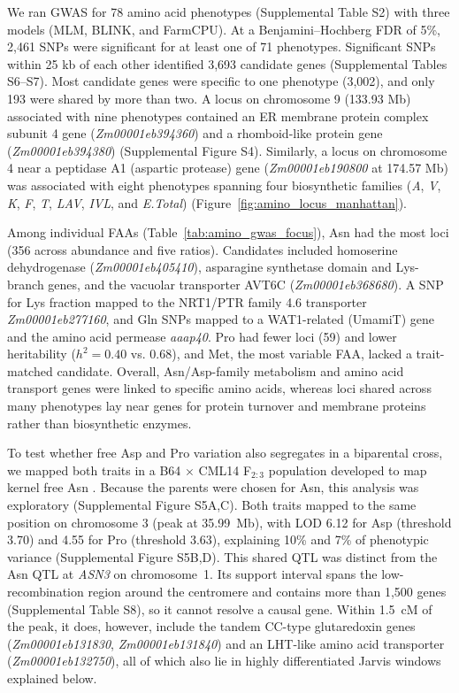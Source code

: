 \documentclass[namedate,unnumsec,webpdf,contemporary,large]{oup-authoring-template}
\begin{document}
We ran GWAS for 78 amino acid phenotypes (Supplemental Table S2) with three models (MLM, BLINK, and FarmCPU). At a Benjamini--Hochberg FDR of 5\%, 2,461 SNPs were significant for at least one of 71 phenotypes. Significant SNPs within 25 kb of each other identified 3,693 candidate genes (Supplemental Tables S6--S7). Most candidate genes were specific to one phenotype (3,002), and only 193 were shared by more than two. A locus on chromosome 9 (133.93 Mb) associated with nine phenotypes contained an ER membrane protein complex subunit 4 gene (\textit{Zm00001eb394360}) and a rhomboid-like protein gene (\textit{Zm00001eb394380}) (Supplemental Figure S4). Similarly, a locus on chromosome 4 near a peptidase A1 (aspartic protease) gene (\textit{Zm00001eb190800} at 174.57 Mb) was associated with eight phenotypes spanning four biosynthetic families (\textit{A}, \textit{V}, \textit{K}, \textit{F}, \textit{T}, \textit{LAV}, \textit{IVL}, and \textit{E.Total}) (Figure~\ref{fig:amino_locus_manhattan}).

Among individual FAAs (Table~\ref{tab:amino_gwas_focus}), Asn had the most loci (356 across abundance and five ratios). Candidates included homoserine dehydrogenase (\textit{Zm00001eb405410}), asparagine synthetase domain and Lys-branch genes, and the vacuolar transporter AVT6C (\textit{Zm00001eb368680}). A SNP for Lys fraction mapped to the NRT1/PTR family 4.6 transporter \textit{Zm00001eb277160}, and Gln SNPs mapped to a WAT1-related (UmamiT) gene and the amino acid permease \textit{aaap40}. Pro had fewer loci (59) and lower heritability ($h^2 = 0.40$ vs. 0.68), and Met, the most variable FAA, lacked a trait-matched candidate. Overall, Asn/Asp-family metabolism and amino acid transport genes were linked to specific amino acids, whereas loci shared across many phenotypes lay near genes for protein turnover and membrane proteins rather than biosynthetic enzymes.

To test whether free Asp and Pro variation also segregates in a biparental cross, we mapped both traits in a B64 $\times$ CML14 F$_{2:3}$ population developed to map kernel free Asn \citep{Fitzsimmons2026KernelKitchen}. Because the parents were chosen for Asn, this analysis was exploratory (Supplemental Figure S5A,C). Both traits mapped to the same position on chromosome 3 (peak at 35.99~Mb), with LOD 6.12 for Asp (threshold 3.70) and 4.55 for Pro (threshold 3.63), explaining 10\% and 7\% of phenotypic variance (Supplemental Figure S5B,D). This shared QTL was distinct from the Asn QTL at \textit{ASN3} on chromosome~1. Its support interval spans the low-recombination region around the centromere and contains more than 1,500 genes (Supplemental Table S8), so it cannot resolve a causal gene. Within 1.5~cM of the peak, it does, however, include the tandem CC-type glutaredoxin genes (\textit{Zm00001eb131830}, \textit{Zm00001eb131840}) and an LHT-like amino acid transporter (\textit{Zm00001eb132750}), all of which also lie in highly differentiated Jarvis windows explained below.
\end{document}
